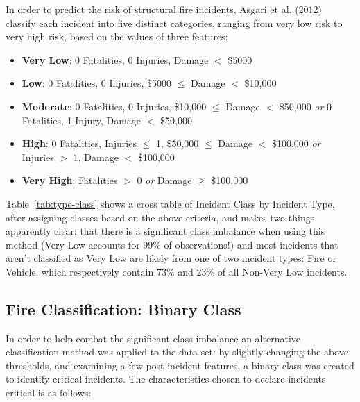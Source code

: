 \documentclass[12pt,letterpaper, oneside]
{article}
\begin{document}
In order to predict the risk of structural fire incidents, Asgari et al. (2012) classify each incident into five distinct categories, ranging from very low risk to very high risk, based on the values of three features:
\begin{itemize}
\item \textbf{Very Low}: 0 Fatalities, 0 Injuries, Damage $<$ \$5000
\item \textbf{Low}: 0 Fatalities, 0 Injuries, \$5000 $\leq$ Damage $<$ \$10,000
\item \textbf{Moderate}: 0 Fatalities, 0 Injuries, \$10,000 $\leq$ Damage $<$ \$50,000 \textit{or} 0 Fatalities, 1 Injury, Damage $<$ \$50,000
\end{itemize}

\begin{itemize}
\item \textbf{High}: 0 Fatalities, Injuries $\leq$ 1, \$50,000 $\leq$ Damage $<$ \$100,000 \textit{or} Injuries $>$ 1, Damage $<$ \$100,000
\item \textbf{Very High}: Fatalities $>$ 0 \textit{or} Damage $\geq$ \$100,000
\end{itemize}

Table~\ref{tab:type-class} shows a cross table of Incident Class by Incident Type, after assigning classes based on the above criteria, and makes two things apparently clear: that there is a significant class imbalance when using this method (Very Low accounts for 99\% of observations!) and most incidents that aren't classified as Very Low are likely from one of two incident types: Fire or Vehicle,  which respectively contain 73\% and 23\% of all Non-Very Low incidents. 

\subsection{Fire Classification: Binary Class}

In order to help combat the significant class imbalance an alternative classification method was applied to the data set: by slightly changing the above thresholds, and examining a few post-incident features, a binary class was created to identify critical incidents. The characteristics chosen to declare incidents critical is as follows:
\end{document}

